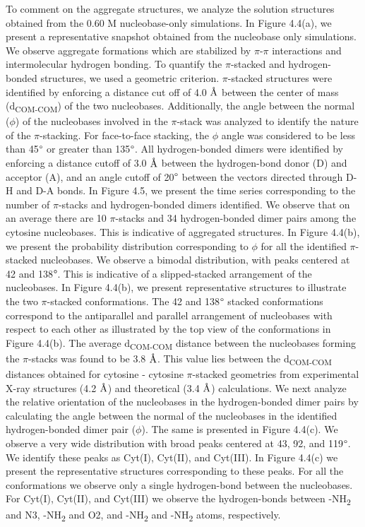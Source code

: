To comment on the aggregate structures, we analyze the solution structures obtained from the 0.60 M nucleobase-only simulations. In Figure 4.4(a), we present a representative snapshot obtained from the nucleobase only simulations. We observe aggregate formations which are stabilized by $\pi$-$\pi$ interactions and intermolecular hydrogen bonding. To quantify the $\pi$-stacked and hydrogen-bonded structures, we used a geometric criterion. $\pi$-stacked structures were identified by enforcing a distance cut off of 4.0 $\text{\normalfont\AA}$ between the center of mass (d\textsubscript{COM-COM}) of the two nucleobases. Additionally, the angle between the normal ($\phi$) of the nucleobases involved in the $\pi$-stack was analyzed to identify the nature of the $\pi$-stacking.  For face-to-face stacking, the $\phi$ angle was considered to be less than 45$\degree$ or greater than 135$\degree$. All hydrogen-bonded dimers were identified by enforcing a distance cutoff of 3.0 $\text{\normalfont\AA}$ between the hydrogen-bond donor (D) and acceptor (A), and an angle cutoff of 20$\degree$ between the vectors directed through D-H and D-A bonds. In Figure 4.5, we present the time series corresponding to the number of $\pi$-stacks and hydrogen-bonded dimers identified. We observe that on an average there are 10 $\pi$-stacks and 34 hydrogen-bonded dimer pairs among the cytosine nucleobases. This is indicative of aggregated structures. In Figure 4.4(b), we present the probability distribution corresponding to $\phi$ for all the identified $\pi$-stacked nucleobases. We observe a bimodal distribution, with peaks centered at 42 and 138$\degree$. This is indicative of a slipped-stacked arrangement of the nucleobases. In Figure 4.4(b), we present representative structures to illustrate the two $\pi$-stacked conformations. The 42 and 138$\degree$ stacked conformations correspond to the antiparallel and parallel arrangement of nucleobases with respect to each other as illustrated by the top view of the conformations in Figure 4.4(b). The average d\textsubscript{COM-COM} distance between the nucleobases forming the $\pi$-stacks was found to be 3.8 $\text{\normalfont\AA}$. This value lies between the d\textsubscript{COM-COM} distances obtained for cytosine - cytosine $\pi$-stacked geometries from experimental X-ray structures (4.2 $\text{\normalfont\AA}$) and theoretical (3.4 $\text{\normalfont\AA}$) calculations.\supercite{mignon_influence_2005} We next analyze the relative orientation of the nucleobases in the hydrogen-bonded dimer pairs by calculating the angle between the normal of the nucleobases in the identified hydrogen-bonded dimer pair ($\phi$). The same is presented in Figure 4.4(c). We observe a very wide distribution with broad peaks centered at 43, 92, and 119$\degree$. We identify these peaks as Cyt(I), Cyt(II), and Cyt(III). In Figure 4.4(c) we present the representative structures corresponding to these peaks. For all the conformations we observe only a single hydrogen-bond between the nucleobases. For Cyt(I), Cyt(II), and Cyt(III) we observe the hydrogen-bonds between -NH\textsubscript{2} and N3, -NH\textsubscript{2} and O2, and -NH\textsubscript{2} and -NH\textsubscript{2} atoms, respectively.
